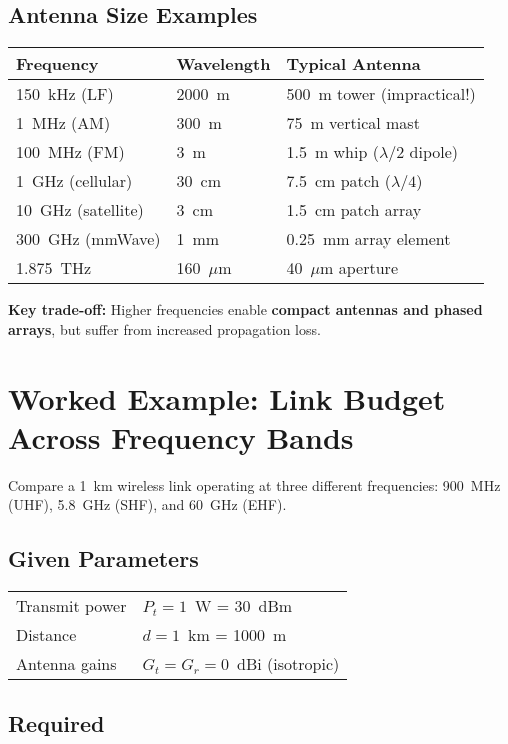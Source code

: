 \subsection{Antenna Size Examples}

\begin{center}
\begin{tabular}{@{}lll@{}}
\toprule
\textbf{Frequency} & \textbf{Wavelength} & \textbf{Typical Antenna} \\
\midrule
150~kHz (LF) & 2000~m & 500~m tower (impractical!) \\
1~MHz (AM) & 300~m & 75~m vertical mast \\
100~MHz (FM) & 3~m & 1.5~m whip ($\lambda/2$ dipole) \\
1~GHz (cellular) & 30~cm & 7.5~cm patch ($\lambda/4$) \\
10~GHz (satellite) & 3~cm & 1.5~cm patch array \\
300~GHz (mmWave) & 1~mm & 0.25~mm array element \\
1.875~THz & 160~$\mu$m & 40~$\mu$m aperture \\
\bottomrule
\end{tabular}
\end{center}

\textbf{Key trade-off:} Higher frequencies enable \textbf{compact antennas and phased arrays}, but suffer from increased propagation loss.

\section{Worked Example: Link Budget Across Frequency Bands}

Compare a 1~km wireless link operating at three different frequencies: 900~MHz (UHF), 5.8~GHz (SHF), and 60~GHz (EHF).

\subsection*{Given Parameters}

\begin{tabular}{@{}ll@{}}
Transmit power & $P_t = 1$~W = 30~dBm \\
Distance & $d = 1$~km = 1000~m \\
Antenna gains & $G_t = G_r = 0$~dBi (isotropic) \\
\end{tabular}

\subsection*{Required}

